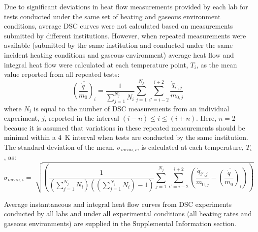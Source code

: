 \documentclass{book}
\begin{document}
\newpage
Due to significant deviations  in heat flow measurements provided by each lab for tests conducted under the same set of heating and gaseous environment conditions, average DSC curves were not calculated based on measurements submitted by different institutions. However, when repeated measurements were available (submitted by the same institution and conducted under the same incident heating conditions and gaseous environment) average heat flow and integral heat flow were calculated at each temperature point, $T_i$, as the mean value reported from all repeated tests:
\begin{equation}
   \overline{ \left( \frac{\dot{q}}{m_0} \right)_i } = \frac{1}{\sum_{j=1}^{N_j}{N_i}} \sum_{j=1}^{N_j} \sum_{i'=i-2}^{i+2} \frac{\dot{q}_{i',j}}{m_{0,j}}
\end{equation}
where $N_i$ is equal to the number of DSC measurements from an individual experiment, $j$, reported in the interval $(i-n) \leq i \leq (i+n)$. Here, $n=2$ because it is assumed that variations in these repeated measurements should be minimal within a 4~K interval when tests are conducted by the same institution. The standard deviation of the mean, $\sigma_{mean,i}$, is calculated at each temperature, $T_i$, as:
\begin{equation}
   \sigma_{mean,i} = \sqrt[]{\left(\frac{1}{({\sum_{j=1}^{N_j}{N_i}})(({\sum_{j=1}^{N_j}{N_i}})-1)} \sum_{j=1}^{N_j} \sum_{i'=i-2}^{i+2} \left( \frac{\dot{q}_{i',j}}{m_{0,j}} - \overline{ \left( \frac{\dot{q}}{m_0} \right)_i }   \right)\right)}
\end{equation}

Average instantaneous and integral heat flow curves from DSC experiments conducted by all labs and under all experimental conditions (all heating rates and gaseous environments) are supplied in the Supplemental Information section.
\end{document}

